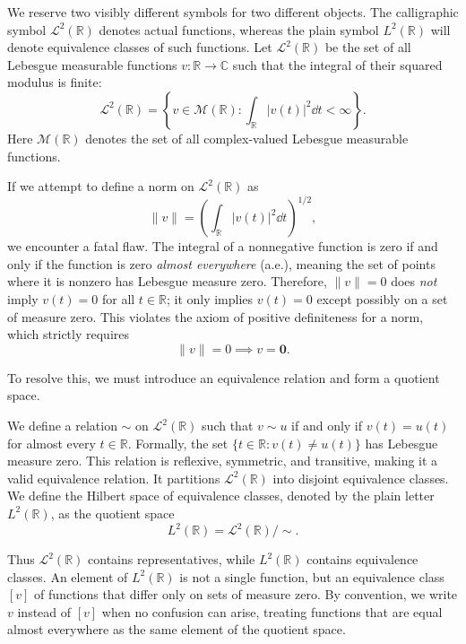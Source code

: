 We reserve two visibly different symbols for two different objects. The
calligraphic symbol $\mathcal{L}^2(\mathbb{R})$ denotes actual functions,
whereas the plain symbol $L^2(\mathbb{R})$ will denote equivalence classes
of such functions. Let $\mathcal{L}^2(\mathbb{R})$ be the set of all
Lebesgue measurable functions $v: \mathbb{R} \to \mathbb{C}$ such that the
integral of their squared modulus is finite:
\begin{equation}
\mathcal{L}^2(\mathbb{R}) = \left\{ v \in \mathcal{M}(\mathbb{R}) : \int_\mathbb{R} |v(t)|^2 \dd t < \infty \right\}.
\end{equation}
Here $\mathcal{M}(\mathbb{R})$ denotes the set of all complex-valued Lebesgue measurable functions.

\begin{remark}
If we attempt to define a norm on $\mathcal{L}^2(\mathbb{R})$ as \[
\|v\| = \left( \int_\mathbb{R} |v(t)|^2 \dd t \right)^{1/2},
\] we encounter a fatal flaw. The integral of a nonnegative function is zero if and only if the function is zero \textit{almost everywhere} (a.e.), meaning the set of points where it is nonzero has Lebesgue measure zero.
Therefore, $\|v\| = 0$ does \textit{not} imply $v(t) = 0$ for all $t \in \mathbb{R}$; it only implies $v(t) = 0$ except possibly on a set of measure zero. This violates the axiom of positive definiteness for a norm, which strictly requires
\[
\|v\| = 0 \implies v = \mathbf{0}.
\]

\end{remark}

To resolve this, we must introduce an equivalence relation and form a quotient space.

\begin{definition}
We define a relation $\sim$ on $\mathcal{L}^2(\mathbb{R})$ such that $v \sim u$ if and only if $v(t) = u(t)$ for almost every $t \in \mathbb{R}$. Formally, the set $\{t \in \mathbb{R} : v(t) \neq u(t)\}$ has Lebesgue measure zero.
This relation is reflexive, symmetric, and transitive, making it a valid equivalence relation. It partitions $\mathcal{L}^2(\mathbb{R})$ into disjoint equivalence classes.
We define the Hilbert space of equivalence classes, denoted by the plain
letter $L^2(\mathbb{R})$, as the quotient space
\begin{equation}
L^2(\mathbb{R})=\mathcal{L}^2(\mathbb{R})/{\sim}.
\end{equation}

Thus $\mathcal{L}^2(\mathbb{R})$ contains representatives, while
$L^2(\mathbb{R})$ contains equivalence classes. An element of
$L^2(\mathbb{R})$ is not a single function, but an equivalence class $[v]$
of functions that differ only on sets of measure zero. By convention, we
write $v$ instead of $[v]$ when no confusion can arise, treating functions
that are equal almost everywhere as the same element of the quotient space.
\end{definition}

